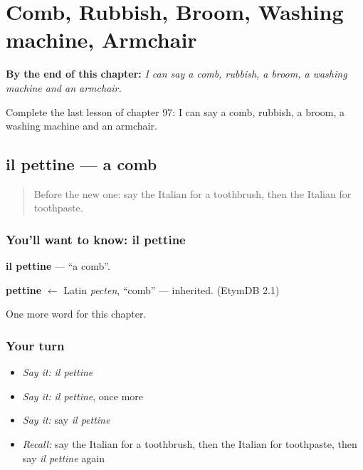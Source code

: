
\chapter{Comb, Rubbish, Broom, Washing machine, Armchair}
\label{ch:it-comb-rubbish-broom-washing-machine-armchair}

\begin{chapteropening}
\textbf{By the end of this chapter:} \emph{I can say a comb, rubbish, a broom, a washing machine and an armchair.}

Complete the last lesson of chapter 97: I can say a comb, rubbish, a broom, a washing machine and an armchair.
\end{chapteropening}

\section[il pettine]{il pettine — a comb}

\label{lesson:IT-C97-pettine}



\begin{quote}
Before the new one: say the Italian for a toothbrush, then the Italian for toothpaste.
\end{quote}

\subsection*{You'll want to know: il pettine}
\textbf{il pettine} — \textquotedblleft{}a comb\textquotedblright{}.

\begin{cousinweb}
\textbf{pettine} $\leftarrow$ Latin \emph{pecten}, \textquotedblleft{}comb\textquotedblright{} — inherited. (EtymDB 2.1)
\end{cousinweb}

\begin{grammarlens}[title={What you've built}]
One more word for this chapter.
\end{grammarlens}

\subsection*{Your turn}
\begin{itemize}
\raggedright
  \item \emph{Say it:} \emph{il pettine}
  \item \emph{Say it:} \emph{il pettine}, once more
  \item \emph{Say it:} say \emph{il pettine}
  \item \emph{Recall:} say the Italian for a toothbrush, then the Italian for toothpaste, then say \emph{il pettine} again
\end{itemize}

